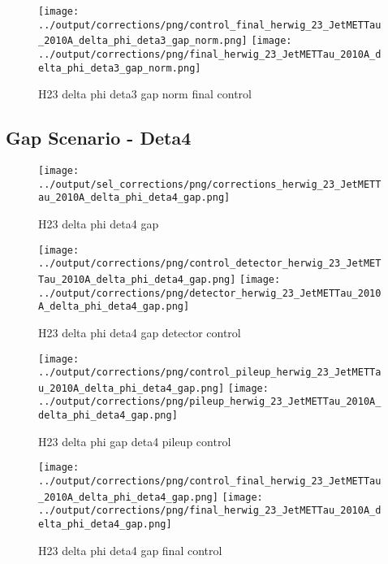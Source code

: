 \documentclass[11pt]{book}
\begin{document}
\begin{figure}[ht]
\centering
\texttt{[image: ../output/corrections/png/control\_final\_herwig\_23\_JetMETTau\_2010A\_delta\_phi\_deta3\_gap\_norm.png]}
\texttt{[image: ../output/corrections/png/final\_herwig\_23\_JetMETTau\_2010A\_delta\_phi\_deta3\_gap\_norm.png]}
\caption{H23 delta phi deta3 gap norm final control}
\label{fig:H23_JetMETTau_2010A_delta_phi_deta3_gap_norm_final_control}
\end{figure}


\clearpage
\subsection{Gap Scenario - Deta4}
\begin{figure}[ht]
\centering
\texttt{[image: ../output/sel\_corrections/png/corrections\_herwig\_23\_JetMETTau\_2010A\_delta\_phi\_deta4\_gap.png]}
\caption{H23 delta phi deta4 gap}
\label{fig:H23_JetMETTau_2010A_delta_phi_deta4_gap}
\end{figure}

\begin{figure}[ht]
\centering
\texttt{[image: ../output/corrections/png/control\_detector\_herwig\_23\_JetMETTau\_2010A\_delta\_phi\_deta4\_gap.png]}
\texttt{[image: ../output/corrections/png/detector\_herwig\_23\_JetMETTau\_2010A\_delta\_phi\_deta4\_gap.png]}
\caption{H23 delta phi deta4 gap detector control}
\label{fig:H23_JetMETTau_2010A_delta_phi_deta4_gap_detector_control}
\end{figure}

\begin{figure}[ht]
\centering
\texttt{[image: ../output/corrections/png/control\_pileup\_herwig\_23\_JetMETTau\_2010A\_delta\_phi\_deta4\_gap.png]}
\texttt{[image: ../output/corrections/png/pileup\_herwig\_23\_JetMETTau\_2010A\_delta\_phi\_deta4\_gap.png]}
\caption{H23 delta phi gap deta4 pileup control}
\label{fig:H23_JetMETTau_2010A_delta_phi_deta4_gap_pileup_control}
\end{figure}


\begin{figure}[ht]
\centering
\texttt{[image: ../output/corrections/png/control\_final\_herwig\_23\_JetMETTau\_2010A\_delta\_phi\_deta4\_gap.png]}
\texttt{[image: ../output/corrections/png/final\_herwig\_23\_JetMETTau\_2010A\_delta\_phi\_deta4\_gap.png]}
\caption{H23 delta phi deta4 gap final control}
\label{fig:H23_JetMETTau_2010A_delta_phi_deta4_gap_final_control}
\end{figure}
\end{document}
